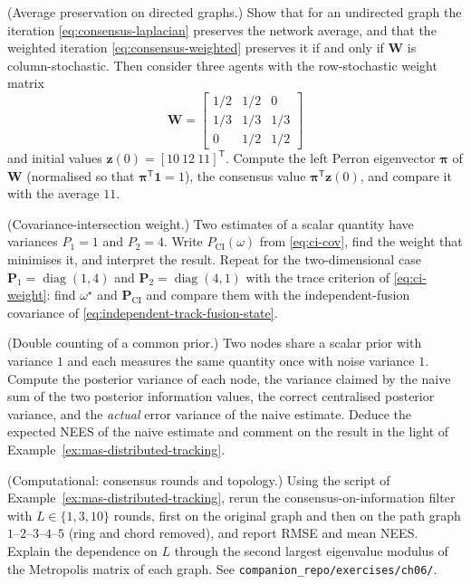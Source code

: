 \documentclass[graybox,envcountchap]{style/SNmono}
\DeclareMathOperator{\diag}{diag}
\newcommand{\repopath}[1]{\texttt{#1}}
\begin{document}
\begin{prob}\label{prob:ch06:2}
(Average preservation on directed graphs.) Show that for an undirected graph the iteration \eqref{eq:consensus-laplacian} preserves the network average, and that the weighted iteration \eqref{eq:consensus-weighted} preserves it if and only if $\mathbf{W}$ is column-stochastic. Then consider three agents with the row-stochastic weight matrix
\begin{equation*}
\mathbf{W}=\begin{bmatrix}1/2&1/2&0\\ 1/3&1/3&1/3\\ 0&1/2&1/2\end{bmatrix}
\end{equation*}
and initial values $\mathbf{z}(0)=[10\ 12\ 11]^{\mathsf T}$. Compute the left Perron eigenvector $\boldsymbol{\pi}$ of $\mathbf{W}$ (normalised so that $\boldsymbol{\pi}^{\mathsf T}\mathbf{1}=1$), the consensus value $\boldsymbol{\pi}^{\mathsf T}\mathbf{z}(0)$, and compare it with the average $11$.
\end{prob}

\begin{prob}\label{prob:ch06:3}
(Covariance-intersection weight.) Two estimates of a scalar quantity have variances $P_1=1$ and $P_2=4$. Write $P_{\mathrm{CI}}(\omega)$ from \eqref{eq:ci-cov}, find the weight that minimises it, and interpret the result. Repeat for the two-dimensional case $\mathbf{P}_1=\diag(1,4)$ and $\mathbf{P}_2=\diag(4,1)$ with the trace criterion of \eqref{eq:ci-weight}: find $\omega^{\star}$ and $\mathbf{P}_{\mathrm{CI}}$ and compare them with the independent-fusion covariance of \eqref{eq:independent-track-fusion-state}.
\end{prob}

\begin{prob}\label{prob:ch06:4}
(Double counting of a common prior.) Two nodes share a scalar prior with variance $1$ and each measures the same quantity once with noise variance $1$. Compute the posterior variance of each node, the variance claimed by the naive sum of the two posterior information values, the correct centralised posterior variance, and the \emph{actual} error variance of the naive estimate. Deduce the expected NEES of the naive estimate and comment on the result in the light of Example~\ref{ex:mas-distributed-tracking}.
\end{prob}

\begin{prob}\label{prob:ch06:5}
(Computational: consensus rounds and topology.) Using the script of Example~\ref{ex:mas-distributed-tracking}, rerun the consensus-on-information filter with $L\in\{1,3,10\}$ rounds, first on the original graph and then on the path graph $1$--$2$--$3$--$4$--$5$ (ring and chord removed), and report RMSE and mean NEES. Explain the dependence on $L$ through the second largest eigenvalue modulus of the Metropolis matrix of each graph. See \repopath{companion\_\allowbreak repo/\allowbreak exercises/\allowbreak ch06/\allowbreak }.
\end{prob}
\end{document}
